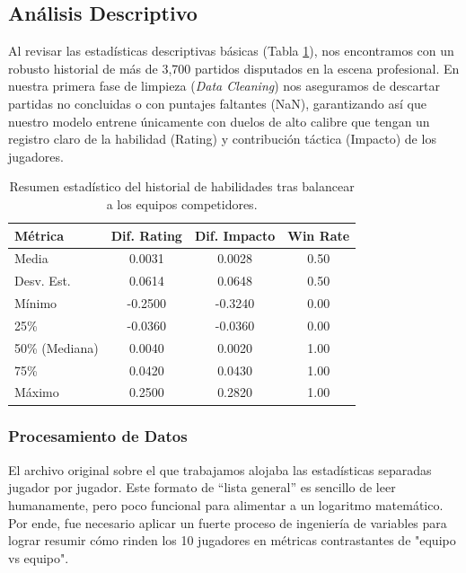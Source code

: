 \documentclass[twocolumn,10pt]{article}
\begin{document}
\subsection{Análisis Descriptivo}
Al revisar las estadísticas descriptivas básicas (Tabla \ref{tab:resumen_stats}), nos encontramos con un robusto historial de más de 3,700 partidos disputados en la escena profesional. En nuestra primera fase de limpieza (\textit{Data Cleaning}) nos aseguramos de descartar partidas no concluidas o con puntajes faltantes (NaN), garantizando así que nuestro modelo entrene únicamente con duelos de alto calibre que tengan un registro claro de la habilidad (Rating) y contribución táctica (Impacto) de los jugadores.

\begin{table}[H]
\centering
\begin{tabular}{@{}lccc@{}}
\toprule
\textbf{Métrica} & \textbf{Dif. Rating} & \textbf{Dif. Impacto} & \textbf{Win Rate} \\ \midrule
Media            & 0.0031             & 0.0028            & 0.50              \\
Desv. Est.       & 0.0614             & 0.0648            & 0.50              \\
Mínimo           & -0.2500            & -0.3240           & 0.00              \\
25\%             & -0.0360            & -0.0360           & 0.00              \\
50\% (Mediana)   & 0.0040             & 0.0020            & 1.00              \\
75\%             & 0.0420             & 0.0430            & 1.00              \\
Máximo           & 0.2500             & 0.2820            & 1.00              \\ \bottomrule
\end{tabular}
\caption{Resumen estadístico del historial de habilidades tras balancear a los equipos competidores.}
\label{tab:resumen_stats}
\end{table}

\subsubsection{Procesamiento de Datos}
El archivo original sobre el que trabajamos alojaba las estadísticas separadas jugador por jugador. Este formato de ``lista general'' es sencillo de leer humanamente, pero poco funcional para alimentar a un logaritmo matemático. Por ende, fue necesario aplicar un fuerte proceso de ingeniería de variables para lograr resumir cómo rinden los 10 jugadores en métricas contrastantes de "equipo vs equipo". 
\end{document}
